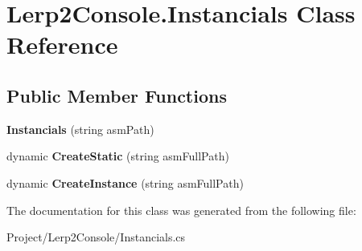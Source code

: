 \hypertarget{class_lerp2_console_1_1_instancials}{}\section{Lerp2\+Console.\+Instancials Class Reference}
\label{class_lerp2_console_1_1_instancials}
\subsection*{Public Member Functions}
\begin{DoxyCompactItemize}
\item 
\mbox{\label{class_lerp2_console_1_1_instancials_aba568dce4b5dd6c077cff6fe6fc62079}} 
{\bfseries Instancials} (string asm\+Path)
\item 
\mbox{\label{class_lerp2_console_1_1_instancials_a2dcd27a046ffc06c3048822c9bcca149}} 
dynamic {\bfseries Create\+Static} (string asm\+Full\+Path)
\item 
\mbox{\label{class_lerp2_console_1_1_instancials_a7825a1356962db87970bf0d7e7592a1b}} 
dynamic {\bfseries Create\+Instance} (string asm\+Full\+Path)
\end{DoxyCompactItemize}


The documentation for this class was generated from the following file\+:\begin{DoxyCompactItemize}
\item 
Project/\+Lerp2\+Console/Instancials.\+cs\end{DoxyCompactItemize}
